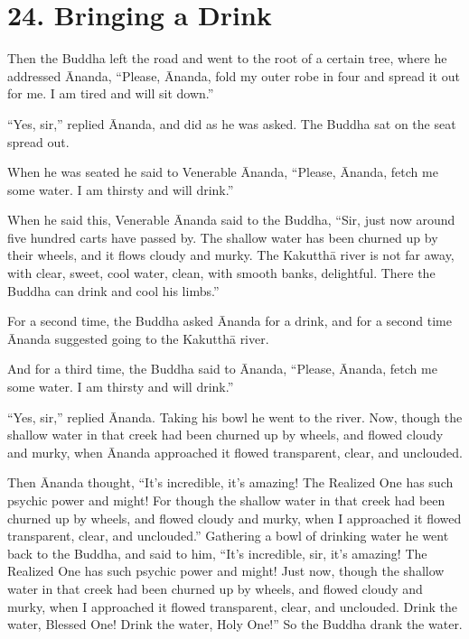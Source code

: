 \documentclass[12pt,openany]{book}%
\begin{document}
\section*{24. Bringing a Drink }

Then the Buddha left the road and went to the root of a certain tree, where he addressed Ānanda, “Please, Ānanda, fold my outer robe in four and spread it out for me. I am tired and will sit down.” 

“Yes, sir,” replied Ānanda, and did as he was asked. The Buddha sat on the seat spread out. 

When he was seated he said to Venerable Ānanda, “Please, Ānanda, fetch me some water. I am thirsty and will drink.” 

When he said this, Venerable Ānanda said to the Buddha, “Sir, just now around five hundred carts have passed by. The shallow water has been churned up by their wheels, and it flows cloudy and murky. The \textsanskrit{Kakutthā} river is not far away, with clear, sweet, cool water, clean, with smooth banks, delightful. There the Buddha can drink and cool his limbs.” 

For a second time, the Buddha asked Ānanda for a drink, and for a second time Ānanda suggested going to the \textsanskrit{Kakutthā} river. 

And for a third time, the Buddha said to Ānanda, “Please, Ānanda, fetch me some water. I am thirsty and will drink.” 

“Yes, sir,” replied Ānanda. Taking his bowl he went to the river. Now, though the shallow water in that creek had been churned up by wheels, and flowed cloudy and murky, when Ānanda approached it flowed transparent, clear, and unclouded. 

Then Ānanda thought, “It’s incredible, it’s amazing! The Realized One has such psychic power and might! For though the shallow water in that creek had been churned up by wheels, and flowed cloudy and murky, when I approached it flowed transparent, clear, and unclouded.” Gathering a bowl of drinking water he went back to the Buddha, and said to him, “It’s incredible, sir, it’s amazing! The Realized One has such psychic power and might! Just now, though the shallow water in that creek had been churned up by wheels, and flowed cloudy and murky, when I approached it flowed transparent, clear, and unclouded. Drink the water, Blessed One! Drink the water, Holy One!” So the Buddha drank the water. 
\end{document}

